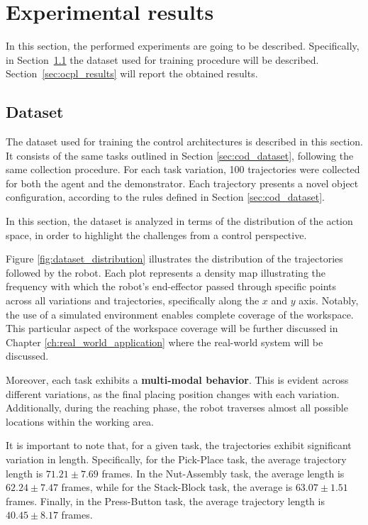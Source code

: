 \section{Experimental results}
\label{sec:ocpl_experimental}

In this section, the performed experiments are going to be described. Specifically, in  
Section~\ref{sec:ocpl_dataset} the dataset used for training procedure will be described. Section~\ref{sec:ocpl_results} will report the obtained results.

\subsection{Dataset}
\label{sec:ocpl_dataset}
The dataset used for training the control architectures is described in this section. It consists of the same tasks outlined in Section \ref{sec:cod_dataset}, following the same collection procedure. For each task variation, 100 trajectories were collected for both the agent and the demonstrator. Each trajectory presents a novel object configuration, according to the rules defined in Section \ref{sec:cod_dataset}.

In this section, the dataset is analyzed in terms of the distribution of the action space, in order to highlight the challenges from a control perspective.

Figure \ref{fig:dataset_distribution} illustrates the distribution of the trajectories followed by the robot. Each plot represents a density map illustrating the frequency with which the robot's end-effector passed through specific points across all variations and trajectories, specifically along the $x$ and $y$ axis. Notably, the use of a simulated environment enables complete coverage of the workspace. This particular aspect of the workspace coverage will be further discussed in Chapter \ref{ch:real_world_application} where the real-world system will be discussed.



Moreover, each task exhibits a \textbf{multi-modal behavior}. This is evident across different variations, as the final placing position changes with each variation. Additionally, during the reaching phase, the robot traverses almost all possible locations within the working area.

It is important to note that, for a given task, the trajectories exhibit significant variation in length. Specifically, for the Pick-Place task, the average trajectory length is \textbf{$71.21 \pm 7.69$} frames. In the Nut-Assembly task, the average length is \textbf{$62.24 \pm 7.47$} frames, while for the Stack-Block task, the average is \textbf{$63.07 \pm 1.51$} frames. Finally, in the Press-Button task, the average trajectory length is\textbf{ $40.45 \pm 8.17$} frames. 

